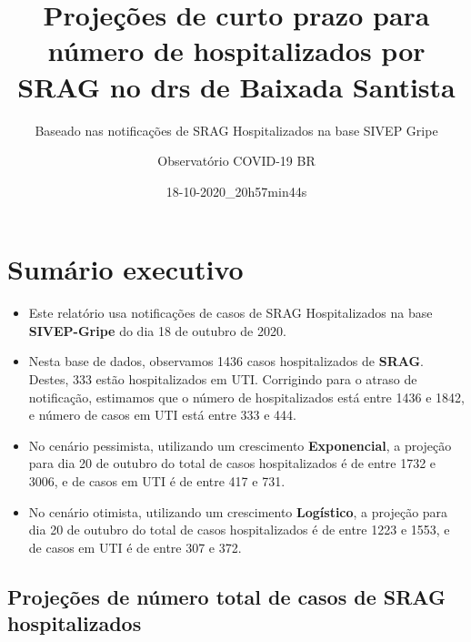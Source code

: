 \documentclass[
]{article}
\title{Projeções de curto prazo para número de hospitalizados por SRAG
no drs de Baixada Santista}
\subtitle{Baseado nas notificações de SRAG Hospitalizados na base SIVEP
Gripe}
\author{Observatório COVID-19 BR}
\date{18-10-2020\_20h57min44s}
\providecommand{\tightlist}{%
  \setlength{\itemsep}{0pt}\setlength{\parskip}{0pt}}
\begin{document}
\maketitle

\hypertarget{sumuxe1rio-executivo}{%
\section{Sumário executivo}\label{sumuxe1rio-executivo}}

\begin{itemize}
\tightlist
\item
  Este relatório usa notificações de casos de SRAG Hospitalizados na
  base \textbf{SIVEP-Gripe} do dia 18 de outubro de 2020.
\item
  Nesta base de dados, observamos 1436 casos hospitalizados de
  \textbf{SRAG}. Destes, 333 estão hospitalizados em UTI. Corrigindo
  para o atraso de notificação, estimamos que o número de hospitalizados
  está entre 1436 e 1842, e número de casos em UTI está entre 333 e 444.
\item
  No cenário pessimista, utilizando um crescimento \textbf{Exponencial},
  a projeção para dia 20 de outubro do total de casos hospitalizados é
  de entre 1732 e 3006, e de casos em UTI é de entre 417 e 731.
\item
  No cenário otimista, utilizando um crescimento \textbf{Logístico}, a
  projeção para dia 20 de outubro do total de casos hospitalizados é de
  entre 1223 e 1553, e de casos em UTI é de entre 307 e 372.
\end{itemize}

\hypertarget{projeuxe7uxf5es-de-nuxfamero-total-de-casos-de-srag-hospitalizados}{%
\subsection{Projeções de número total de casos de SRAG
hospitalizados}\label{projeuxe7uxf5es-de-nuxfamero-total-de-casos-de-srag-hospitalizados}}
\end{document}
